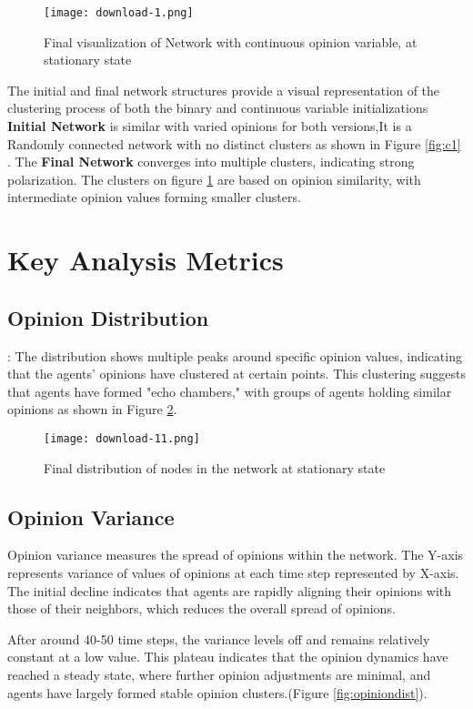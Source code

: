 \documentclass{article} %
\begin{document}
\begin{figure}
    \centering
    \texttt{[image: download-1.png]}
    \caption{Final visualization of Network with continuous opinion variable, at stationary state}
    \label{fig:c2}
\end{figure}


The initial and final network structures provide a visual representation of the clustering process of both the binary and continuous variable initializations
\textbf{Initial Network} is similar with varied opinions for both versions,It is a Randomly connected network with no distinct clusters as shown in Figure  \ref{fig:c1} .
The \textbf{Final Network}  converges into multiple clusters, indicating strong polarization. The clusters on figure \ref{fig:c2} are based on opinion similarity, with intermediate opinion values forming smaller clusters.

\section{Key Analysis Metrics}

\subsection{Opinion Distribution}:
The distribution shows multiple peaks around specific opinion values, indicating that the agents' opinions have clustered at certain points. This clustering suggests that agents have formed "echo chambers," with groups of agents holding similar opinions as shown in Figure \ref{fig:finopinion}.

\begin{figure}[h]
    \centering
    \texttt{[image: download-11.png]}
    \caption{Final distribution of nodes in the network at stationary state}
    \label{fig:finopinion}
\end{figure}

\subsection{Opinion Variance}
Opinion variance measures the spread of opinions within the network. The Y-axis represents variance of values of opinions at each time step represented by X-axis. The initial decline indicates that agents are rapidly aligning their opinions with those of their neighbors, which reduces the overall spread of opinions.

After around 40-50 time steps, the variance levels off and remains relatively constant at a low value. This plateau indicates that the opinion dynamics have reached a steady state, where further opinion adjustments are minimal, and agents have largely formed stable opinion clusters.(Figure \ref{fig:opiniondist}).
\end{document}
